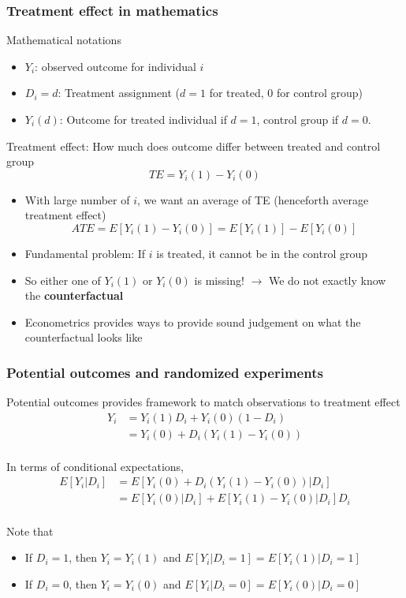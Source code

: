 \documentclass[aspectratio=169]{beamer}
\newenvironment{wideitemize}{\itemize\addtolength{\itemsep}{10pt}}{\enditemize}
\begin{document}
\begin{frame}
\frametitle{Treatment effect in mathematics} 
\begin{wideitemize}
\item Mathematical notations
\begin{itemize}
  \item $Y_i$: observed outcome for individual $i$ %
  \item $D_i=d$: Treatment assignment ($d=1$ for treated, 0 for control group) 
  \item $Y_i(d)$: Outcome for treated individual if $d=1$, control group if $d=0$. 
\end{itemize}
\item Treatment effect: How much does outcome differ between treated and control group
\[
  TE = Y_i(1)-Y_i(0)
\]
\begin{itemize}
\item With large number of $i$, we want an average of TE (henceforth average treatment effect)
\[
ATE = E[Y_i(1)-Y_i(0)]=E[Y_i(1)]-E[Y_i(0)]
\]
\item Fundamental problem: If $i$ is treated, it cannot be in the control group 
\item So either one of $Y_i(1)$ or $Y_i(0)$ is missing! $\to$ We do not exactly know the \textbf{counterfactual}
\item Econometrics provides ways to provide sound judgement on what the counterfactual looks like  
\end{itemize}
\end{wideitemize}
\end{frame}



\begin{frame}
\frametitle{Potential outcomes and randomized experiments} 
\begin{wideitemize}
\item Potential outcomes provides framework to match observations to treatment effect
\[ 
\begin{aligned}
Y_ i &= Y_i(1)D_i + Y_i(0)(1-D_i)\\
&=Y_i(0)+D_i(Y_i(1)-Y_i(0))\\
\end{aligned}
\]
\item In terms of conditional expectations, 
\[ 
\begin{aligned}
E[Y_ i|D_i] &=E[Y_i(0)+D_i(Y_i(1)-Y_i(0)) |D_i]   \\
&=E[Y_i(0)|D_i]+E[Y_i(1)-Y_i(0)|D_i]D_i \\
\end{aligned}
\]
\item Note that 
\begin{itemize}
\item If $D_i=1$, then $Y_i = Y_i(1)$ and $E[Y_i|D_i=1]=E[Y_i(1)|D_i=1]$
\item If $D_i=0$, then $Y_i = Y_i(0)$ and $E[Y_i|D_i=0]=E[Y_i(0)|D_i=0]$
\end{itemize}
\end{wideitemize}
\end{frame}
\end{document}
